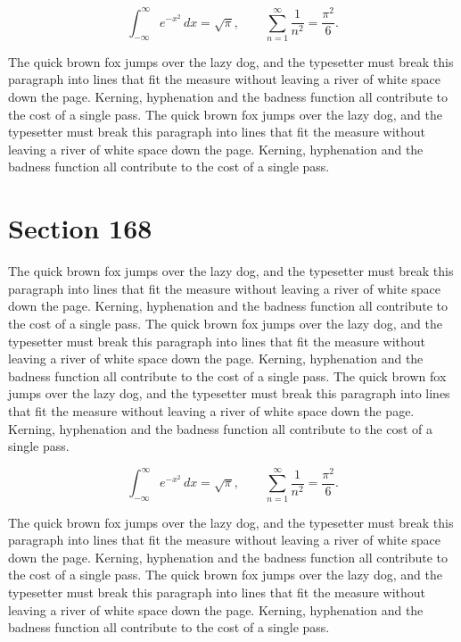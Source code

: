 \documentclass{article}
\begin{document}
\begin{equation}
\int_{-\infty}^{\infty} e^{-x^{2}}\,dx = \sqrt{\pi}, \qquad
\sum_{n=1}^{\infty} \frac{1}{n^{2}} = \frac{\pi^{2}}{6}.
\end{equation}

The quick brown fox jumps over the lazy dog, and the typesetter must break this paragraph into lines that fit the measure without leaving a river of white space down the page. Kerning, hyphenation and the badness function all contribute to the cost of a single pass. The quick brown fox jumps over the lazy dog, and the typesetter must break this paragraph into lines that fit the measure without leaving a river of white space down the page. Kerning, hyphenation and the badness function all contribute to the cost of a single pass. 
\section{Section 168}
The quick brown fox jumps over the lazy dog, and the typesetter must break this paragraph into lines that fit the measure without leaving a river of white space down the page. Kerning, hyphenation and the badness function all contribute to the cost of a single pass. The quick brown fox jumps over the lazy dog, and the typesetter must break this paragraph into lines that fit the measure without leaving a river of white space down the page. Kerning, hyphenation and the badness function all contribute to the cost of a single pass. The quick brown fox jumps over the lazy dog, and the typesetter must break this paragraph into lines that fit the measure without leaving a river of white space down the page. Kerning, hyphenation and the badness function all contribute to the cost of a single pass. 

\begin{equation}
\int_{-\infty}^{\infty} e^{-x^{2}}\,dx = \sqrt{\pi}, \qquad
\sum_{n=1}^{\infty} \frac{1}{n^{2}} = \frac{\pi^{2}}{6}.
\end{equation}

The quick brown fox jumps over the lazy dog, and the typesetter must break this paragraph into lines that fit the measure without leaving a river of white space down the page. Kerning, hyphenation and the badness function all contribute to the cost of a single pass. The quick brown fox jumps over the lazy dog, and the typesetter must break this paragraph into lines that fit the measure without leaving a river of white space down the page. Kerning, hyphenation and the badness function all contribute to the cost of a single pass. 
\end{document}
